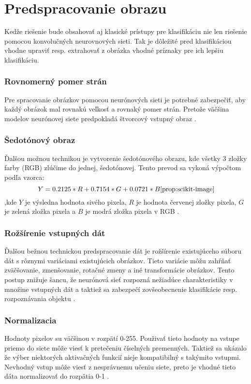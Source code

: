 
\section{Predspracovanie obrazu}
\label{sec:preprocessing}
Kedže riešenie bude obsahovať aj klasické prístupy pre klasifikáciu nie len riešenie pomocou konvolučných neurovnových sieti.
Tak je dôležité pred klasifikáciou vhodne upraviť resp. extrahovať z obrázka vhodné príznaky pre ich lepšiu klasifikáciu.

\subsubsection{Rovnomerný pomer strán}
Pre spracovanie obrázkov pomocou neurónových sieti je potrebné zabezpečiť, aby každý obrázok mal rovnakú veľkosť a rovnaký pomer strán.
Pretože väčšina modelov neurónovej siete predpokladá štvorcový vstupný obraz \cite{odkaz:NNPreprocessing}.

\subsubsection{Šedotónový obraz}
Ďalšou možnou technikou je vytvorenie šedotónového obrazu, kde všetky 3 zložky farby (RGB) zlúčime do jednej, šedotónovej.
Tento prevod sa vykoná výpočtom podľa vzorca:
\begin{equation}
    \label{eq:rgbtogray}
    Y = 0.2125*R + 0.7154*G + 0.0721*B\cite{prop:scikit-image}
\end{equation}
,kde $Y$ je výsledna hodnota sivého pixela, $R$ je hodnota červenej zložky pixela,
$G$ je zelená zložka pixela a $B$ je modrá zložka pixela v RGB \cite{odkaz:NNPreprocessing}.

\subsubsection{Rožšírenie vstupných dát}
Ďalšou bežnou technickou predspracovanie dát je rožšírenie existujúceho súboru dát s rôznymi variáciami existujúcich obrázkov.
Tieto variácie môžu zahŕňať zväčšovanie, zmenšovanie, rotačné zmeny a iné transformácie obrázkov.
Tento postup znižuje šancu, že neurónová sieť rozpozná nežiadúce charakteristiky v množine vstupných dát
	a taktiež sa zabezpečí zovšeobecnenie klasifikácie resp. rozpoznávania objektu \cite{odkaz:NNPreprocessing}.

\subsubsection{Normalizacia}
Hodnoty pixelov su väčšinou v rozpätí 0-255. Použivať tieto hodnoty na vstupe priemo do siete môže viesť k pretečeniu číselných premenných.
Taktiež sa ukázalo že výber niektorých aktivačných funkcií nieje kompatibilný s takýmito vstupmi.
Nevhodný vstup môže viesť z nesprávnemu učeniu siete, preto je vhodné tieto dáta normalizovať do rozpätia 0-1 \cite{odkaz:PreprocessingNormalization}.


